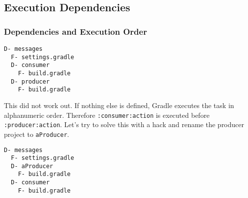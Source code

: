 \subsection{Execution Dependencies} %
\label{sub:execution_time_dependencies}

\subsubsection{Dependencies and Execution Order} %
\label{ssub:dependencies_and_execution_order}

\begin{minipage}[t]{7cm}
\begin{Verbatim}[frame=single,label=Project Tree]
D- messages
  F- settings.gradle
  D- consumer
    F- build.gradle
  D- producer
    F- build.gradle
\end{Verbatim}
\end{minipage}	
\begin{minipage}[t]{9cm}
\end{minipage}

This did not work out. If nothing else is defined, Gradle executes the task in alphanumeric order. Therefore \texttt{:consumer:action} is executed before \texttt{:producer:action}. Let's try to solve this with a hack and rename the producer project to \texttt{aProducer}.

\begin{minipage}[t]{7cm}
\begin{Verbatim}[frame=single,label=Project Tree]
D- messages
  F- settings.gradle
  D- aProducer
    F- build.gradle
  D- consumer
    F- build.gradle
\end{Verbatim}
\end{minipage}	
\begin{minipage}[t]{9cm}
\end{minipage}

